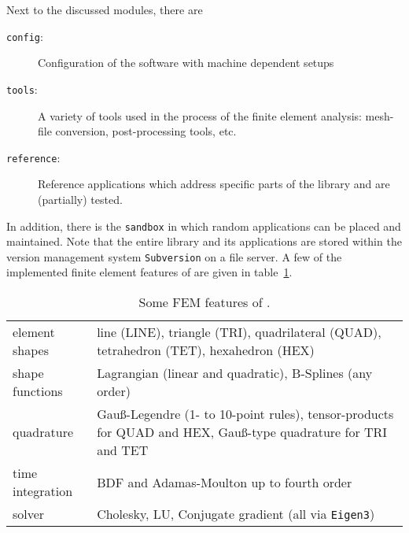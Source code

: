 Next to the discussed modules, there are
\begin{description}
\item[\texttt{config}:] Configuration of the software with machine
  dependent setups
\item[\texttt{tools}:] A variety of tools used in the process of the
  finite element analysis: mesh-file conversion, post-processing
  tools, etc.
\item[\texttt{reference}:] Reference applications which address
  specific parts of the library and are (partially) tested.
\end{description}
In addition, there is the \texttt{sandbox} in which random
applications can be placed and maintained. Note that the entire
library and its applications are stored within the version management
system \texttt{Subversion} on a file server. A few of the implemented
finite element features of \IS{} are given in
table~\ref{tab:features}.
\begin{table}[bthp]
  \centering
  \begin{tabular}{lp{}}
	\toprule
    element shapes 
    &line (LINE), triangle (TRI), quadrilateral (QUAD), tetrahedron (TET),
    hexahedron (HEX)\\
    shape functions 
    &Lagrangian (linear and quadratic), B-Splines (any order)\\
    quadrature 
    &Gau\ss{}-Legendre (1- to 10-point rules), tensor-products
    for QUAD and HEX, Gau\ss{}-type quadrature for TRI and TET\\
    time integration
    &BDF and Adamas-Moulton up to fourth order \\
    solver
    &Cholesky, LU, Conjugate gradient (all via \texttt{Eigen3})\\
	\bottomrule
  \end{tabular}
  \caption{Some FEM features of \IS{}.}
  \label{tab:features}
\end{table}
